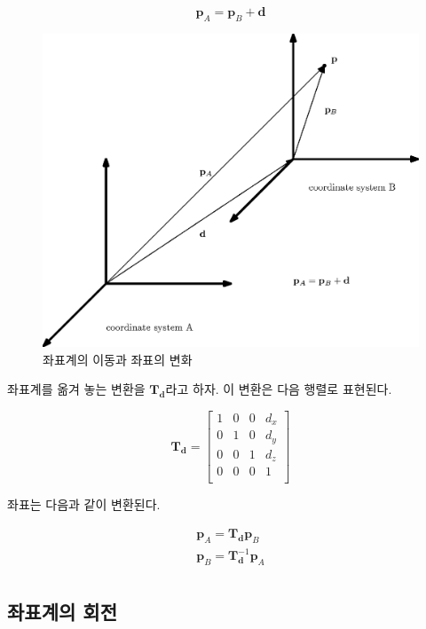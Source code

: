 $$\mathbf p_A = \mathbf p_B + \mathbf d$$

\begin{figure}[h!]
  \centering
    \includegraphics[width=12cm]{Math_transform/coordinateTranslate.eps}
    \caption{좌표계의 이동과 좌표의 변화}
    \label{fig:transform:coordinateTranslate}
\end{figure}

좌표계를 옮겨 놓는 변환을 $\mathbf T_{\mathbf d}$라고 하자.
이 변환은 다음 행렬로 표현된다.

$$
\mathbf T_{\mathbf d} = \left [
\begin{array}{cccc}
1 & 0 & 0 & d_x \\
0 & 1 & 0 & d_y \\
0 & 0 & 1 & d_z \\
0 & 0 & 0 & 1 \\
\end{array}
\right ]
$$

좌표는 다음과 같이 변환된다.

\begin{eqnarray}
\mathbf p_A = \mathbf T_{\mathbf d} \mathbf p_B \\ \nonumber
\mathbf p_B = \mathbf T_{\mathbf d}^{-1} \mathbf p_A \\ \nonumber
\end{eqnarray}

\subsection{좌표계의 회전}


